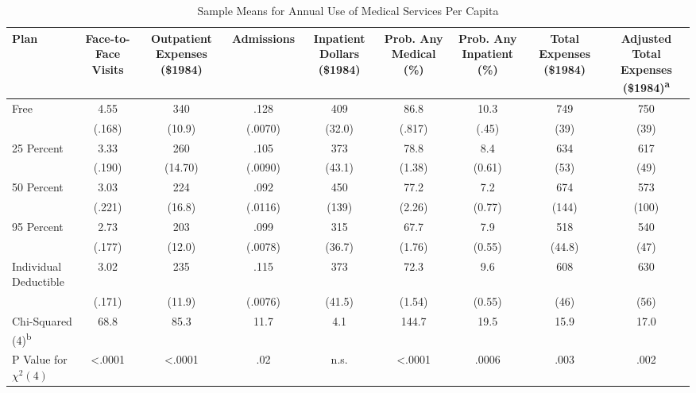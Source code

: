\begin{table}[ht]
    \centering
    \begin{tabular}{lcccccccc}
    \hline
    Plan & Face-to-Face Visits & Outpatient Expenses (\$1984) & Admissions & Inpatient Dollars (\$1984) & Prob. Any Medical (\%) & Prob. Any Inpatient (\%) & Total Expenses (\$1984) & Adjusted Total Expenses (\$1984)\textsuperscript{a} \\
    \hline
    Free & 4.55 & 340 & .128 & 409 & 86.8 & 10.3 & 749 & 750 \\
     & (.168) & (10.9) & (.0070) & (32.0) & (.817) & (.45) & (39) & (39) \\
    25 Percent & 3.33 & 260 & .105 & 373 & 78.8 & 8.4 & 634 & 617 \\
     & (.190) & (14.70) & (.0090) & (43.1) & (1.38) & (0.61) & (53) & (49) \\
    50 Percent & 3.03 & 224 & .092 & 450 & 77.2 & 7.2 & 674 & 573 \\
     & (.221) & (16.8) & (.0116) & (139) & (2.26) & (0.77) & (144) & (100) \\
    95 Percent & 2.73 & 203 & .099 & 315 & 67.7 & 7.9 & 518 & 540 \\
     & (.177) & (12.0) & (.0078) & (36.7) & (1.76) & (0.55) & (44.8) & (47) \\
    Individual Deductible & 3.02 & 235 & .115 & 373 & 72.3 & 9.6 & 608 & 630 \\
     & (.171) & (11.9) & (.0076) & (41.5) & (1.54) & (0.55) & (46) & (56) \\
    \hline
    Chi-Squared (4)\textsuperscript{b} & 68.8 & 85.3 & 11.7 & 4.1 & 144.7 & 19.5 & 15.9 & 17.0 \\
    P Value for $\chi^2 (4)$ & <.0001 & <.0001 & .02 & n.s. & <.0001 & .0006 & .003 & .002 \\
    \hline
    \end{tabular}
    \caption{Sample Means for Annual Use of Medical Services Per Capita}
\end{table}